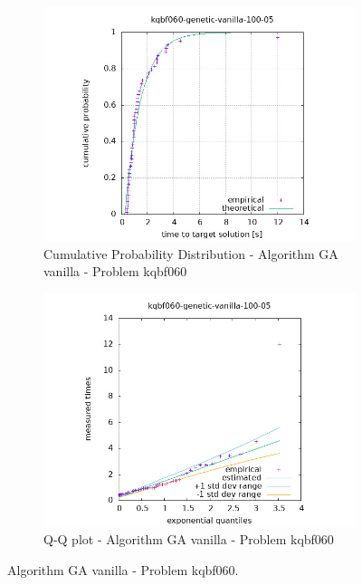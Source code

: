 \begin{figure}[H]
    \centering
    \begin{subfigure}{0.49\textwidth}
        \includegraphics[width=\textwidth]{figure/ttt_plot/kqbf060-genetic-vanilla-100-05-exp.jpeg}
        \caption{Cumulative Probability Distribution - Algorithm GA vanilla - Problem kqbf060}
        \label{fig:ga-vanilla-kqbf060-exp}
    \end{subfigure}
    \hfill
    \begin{subfigure}{0.49\textwidth}
        \includegraphics[width=\textwidth]{figure/ttt_plot/kqbf060-genetic-vanilla-100-05-qq.jpeg}
        \caption{Q-Q plot - Algorithm GA vanilla - Problem kqbf060}
        \label{fig:ga-vanilla-kqbf060-qq}
    \end{subfigure}
    \caption{Algorithm GA vanilla - Problem kqbf060.}
    \label{fig:ga-vanilla-kqbf060}
\end{figure}


